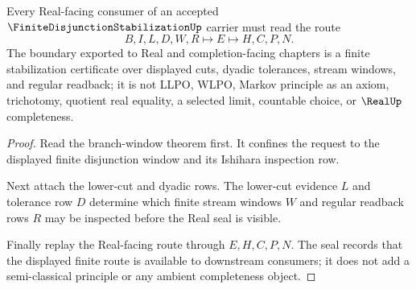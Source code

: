 \begin{theorem}
\label{thm:finite-disjunction-stabilization-real-boundary}
Every Real-facing consumer of an accepted $\FiniteDisjunctionStabilizationUp$ carrier must read the route
$$
B,I,L,D,W,R \longmapsto E \longmapsto H,C,P,N .
$$
The boundary exported to Real and completion-facing chapters is a finite stabilization certificate over displayed cuts, dyadic tolerances, stream windows, and regular readback; it is not LLPO, WLPO, Markov principle as an axiom, trichotomy, quotient real equality, a selected limit, countable choice, or $\RealUp$ completeness.
\end{theorem}
\begin{proof}
Read the branch-window theorem first. It confines the request to the displayed finite disjunction window and its Ishihara inspection row.

Next attach the lower-cut and dyadic rows. The lower-cut evidence $L$ and tolerance row $D$ determine which finite stream windows $W$ and regular readback rows $R$ may be inspected before the Real seal is visible.

Finally replay the Real-facing route through $E,H,C,P,N$. The seal records that the displayed finite route is available to downstream consumers; it does not add a semi-classical principle or any ambient completeness object.
\end{proof}




